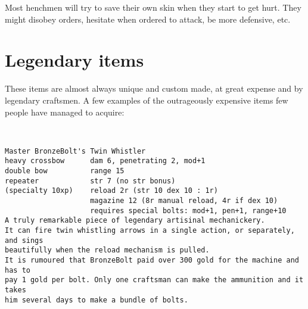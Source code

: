 Most henchmen will try to save their own skin when they start to get hurt. They might disobey orders, hesitate when ordered to attack, be more defensive, etc.









\section*{Legendary items}


These items are almost always unique and custom made, at great expense and by legendary craftsmen. A few examples of the outrageously expensive items few people have managed to acquire:

\

\small \begin{samepage} \begin{verbatim}
Master BronzeBolt's Twin Whistler
heavy crossbow      dam 6, penetrating 2, mod+1
double bow          range 15
repeater            str 7 (no str bonus)
(specialty 10xp)    reload 2r (str 10 dex 10 : 1r)
                    magazine 12 (8r manual reload, 4r if dex 10)
                    requires special bolts: mod+1, pen+1, range+10
A truly remarkable piece of legendary artisinal mechanickery. 
It can fire twin whistling arrows in a single action, or separately, and sings
beautifully when the reload mechanism is pulled.
It is rumoured that BronzeBolt paid over 300 gold for the machine and has to 
pay 1 gold per bolt. Only one craftsman can make the ammunition and it takes 
him several days to make a bundle of bolts.
\end{verbatim} \end{samepage} \normalsize


